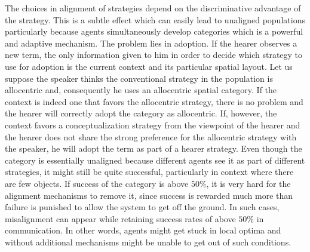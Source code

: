 The choices in alignment of strategies depend on the discriminative advantage of the strategy. 
This is a subtle effect which can easily lead to unaligned populations particularly because
agents simultaneously develop categories which is a powerful and adaptive mechanism.
The problem lies in adoption. If the hearer observes a new term,
the only information given to him in order to decide which strategy to use for adoption is the current
context and its particular spatial layout. Let us suppose the speaker thinks the conventional 
strategy in the population is allocentric and, consequently he uses an allocentric spatial
category. If the context is indeed one that favors the allocentric strategy, there is no problem and
the hearer will correctly adopt the category as allocentric. If, however, the context favors a
conceptualization strategy from the viewpoint of the hearer and the hearer does not share the 
strong preference for the allocentric strategy with the speaker, he will adopt the term as 
part of a hearer strategy. Even though the category is essentially unaligned
because different agents see it as part of different strategies, it might still be quite successful, 
particularly in context where there are few objects. 
If success of the category is above $50\%$, it is very hard for the alignment mechanisms 
to remove it, since success is rewarded much more than failure is punished to allow 
the system to get off the ground. In such cases, misalignment can appear while retaining
success rates of above $50\%$ in communication. In other words, agents might get stuck in 
local optima and without additional mechanisms might be unable to get out of such
conditions.


